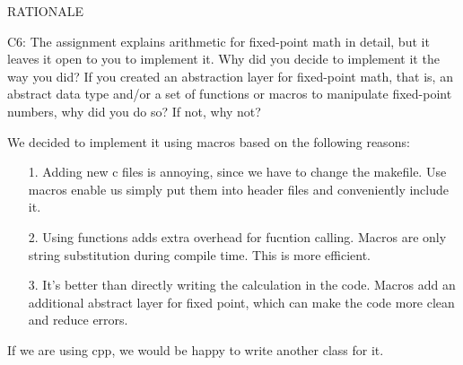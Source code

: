 \begin{aspect}{RATIONALE}
  \begin{qc}
    C6: The assignment explains arithmetic for fixed-point math in detail, but it leaves it open to you to implement it.  Why did you decide to implement it the way you did?  If you created an abstraction layer for fixed-point math, that is, an abstract data type and/or a set of functions or macros to manipulate fixed-point numbers, why did you do so?  If not, why not?
  \end{qc}
  We decided to implement it using macros based on the following reasons:
  \begin{itemize}
    \item[1.] Adding new c files is annoying, since we have to change the makefile. Use macros enable us simply put them into header files and conveniently include it.
    \item[2.] Using functions adds extra overhead for fucntion calling. Macros are only string substitution during compile time. This is more efficient.
    \item[3.] It's better than directly writing the calculation in the code. Macros add an additional abstract layer for fixed point, which can make the code more clean and reduce errors.
  \end{itemize}
  If we are using cpp, we would be happy to write another class for it.
\end{aspect}
